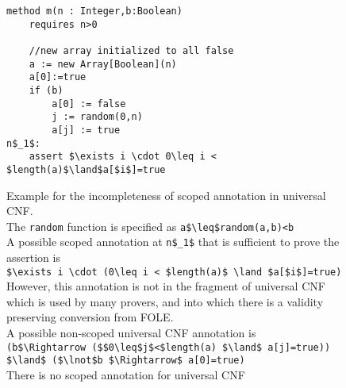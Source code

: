 \begin{figure}
\begin{lstlisting}
method m(n : Integer,b:Boolean)
	requires n>0
	
	//new array initialized to all false
	a := new Array[Boolean](n)
	a[0]:=true
	if (b)
		a[0] := false
		j := random(0,n)
		a[j] := true
n$_1$:
	assert $\exists i \cdot 0\leq i < $length(a)$\land$a[$i$]=true
\end{lstlisting}
\caption{Example for the incompleteness of scoped annotation in universal CNF.\\
The \lstinline|random| function is specified as \lstinline|a$\leq$random(a,b)<b|\\
A possible scoped annotation at \lstinline|n$_1$| that is sufficient to prove the assertion is \\
\lstinline|$\exists i \cdot (0\leq i < $length(a)$ \land $a[$i$]=true)|\\
However, this annotation is not in the fragment of universal CNF which is used by many provers, and into which there is a validity preserving conversion from FOLE.\\
A possible non-scoped universal CNF annotation is\\
\indent\lstinline|(b$\Rightarrow ($$0\leq$j$<$length(a) $\land$ a[j]=true)) $\land$ ($\lnot$b $\Rightarrow$ a[0]=true)|\\
There is no scoped annotation for universal CNF
}
\label{snippet_1.4}
\end{figure}

